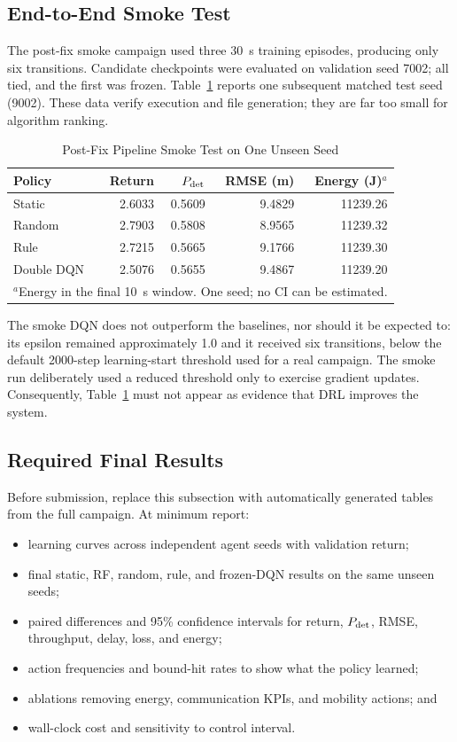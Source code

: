 \documentclass[10pt,conference]{IEEEtran}
\begin{document}
\subsection{End-to-End Smoke Test}

The post-fix smoke campaign used three 30~s training episodes, producing only
six transitions. Candidate checkpoints were evaluated on validation seed 7002;
all tied, and the first was frozen. Table~\ref{tab:smoke} reports one subsequent
matched test seed (9002). These data verify execution and file generation; they
are far too small for algorithm ranking.

\begin{table}[t]
\caption{Post-Fix Pipeline Smoke Test on One Unseen Seed}
\label{tab:smoke}
\centering
\scriptsize
\begin{tabular}{lrrrr}
\toprule
Policy & Return & $P_{\rm det}$ & RMSE (m) & Energy (J)$^a$\\
\midrule
Static & 2.6033 & 0.5609 & 9.4829 & 11239.26\\
Random & 2.7903 & 0.5808 & 8.9565 & 11239.32\\
Rule & 2.7215 & 0.5665 & 9.1766 & 11239.30\\
Double DQN & 2.5076 & 0.5655 & 9.4867 & 11239.20\\
\bottomrule
\multicolumn{5}{l}{\scriptsize $^a$Energy in the final 10~s window. One seed; no CI can be estimated.}
\end{tabular}
\end{table}

The smoke DQN does not outperform the baselines, nor should it be expected to:
its epsilon remained approximately 1.0 and it received six transitions, below
the default 2000-step learning-start threshold used for a real campaign. The
smoke run deliberately used a reduced threshold only to exercise gradient
updates. Consequently, Table~\ref{tab:smoke} must not appear as evidence that
DRL improves the system.

\subsection{Required Final Results}

Before submission, replace this subsection with automatically generated tables
from the full campaign. At minimum report:
\begin{itemize}
  \item learning curves across independent agent seeds with validation return;
  \item final static, RF, random, rule, and frozen-DQN results on the same
  unseen seeds;
  \item paired differences and 95\% confidence intervals for return,
  $P_{\rm det}$, RMSE, throughput, delay, loss, and energy;
  \item action frequencies and bound-hit rates to show what the policy learned;
  \item ablations removing energy, communication KPIs, and mobility actions;
  and
  \item wall-clock cost and sensitivity to control interval.
\end{itemize}
\end{document}
